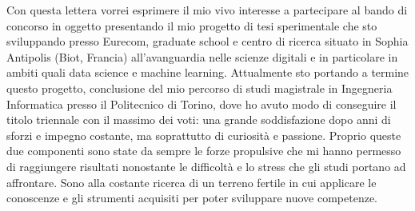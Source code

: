 \documentclass[11pt, a4paper]{dogear-cv}
\begin{document}
\makecvheader[L]


\makelettertitle

\begin{cvletter}

Con questa lettera vorrei esprimere il mio vivo interesse a partecipare al bando di concorso in oggetto presentando il mio progetto di tesi sperimentale che sto sviluppando presso Eurecom, graduate school e centro di ricerca situato in Sophia Antipolis (Biot, Francia) all'avanguardia nelle scienze digitali e in particolare in ambiti quali data science e machine learning. 
Attualmente sto portando a termine questo progetto, conclusione del mio percorso di studi magistrale in Ingegneria Informatica presso il Politecnico di Torino, dove ho avuto modo di conseguire il titolo triennale con il massimo dei voti: una grande soddisfazione dopo anni di sforzi e impegno costante, ma soprattutto di curiosità e passione.
Proprio queste due componenti sono state da sempre le forze propulsive che mi hanno permesso di raggiungere risultati nonostante le difficoltà e lo stress che gli studi portano ad affrontare. Sono alla costante ricerca di un terreno fertile in cui applicare le conoscenze e gli strumenti acquisiti per poter sviluppare nuove competenze. 


\end{cvletter}
\end{document}
